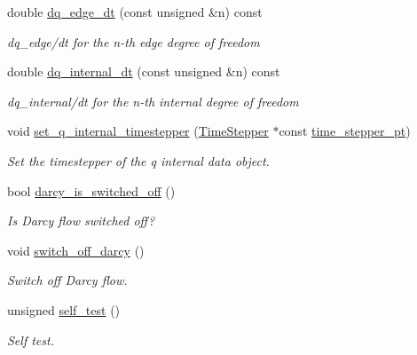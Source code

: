 \begin{DoxyCompactItemize}
double \hyperlink{classoomph_1_1AxisymmetricPoroelasticityEquations_aed0d46b9eea284a67bc3cc09571699a5}{dq\+\_\+edge\+\_\+dt} (const unsigned \&n) const
\begin{DoxyCompactList}\small\item\em dq\+\_\+edge/dt for the n-\/th edge degree of freedom \end{DoxyCompactList}\item 
double \hyperlink{classoomph_1_1AxisymmetricPoroelasticityEquations_a18c5fd291de25073cbef16ee6d0a4711}{dq\+\_\+internal\+\_\+dt} (const unsigned \&n) const
\begin{DoxyCompactList}\small\item\em dq\+\_\+internal/dt for the n-\/th internal degree of freedom \end{DoxyCompactList}\item 
void \hyperlink{classoomph_1_1AxisymmetricPoroelasticityEquations_aaa80b2ec1bfc01f49577560835d9d86d}{set\+\_\+q\+\_\+internal\+\_\+timestepper} (\hyperlink{classoomph_1_1TimeStepper}{Time\+Stepper} $\ast$const \hyperlink{classoomph_1_1GeomObject_a3c92023891dd4a0e818022f467eeb7f1}{time\+\_\+stepper\+\_\+pt})
\begin{DoxyCompactList}\small\item\em Set the timestepper of the q internal data object. \end{DoxyCompactList}\item 
bool \hyperlink{classoomph_1_1AxisymmetricPoroelasticityEquations_aaaff3ab360c7a99c6595624b035700a3}{darcy\+\_\+is\+\_\+switched\+\_\+off} ()
\begin{DoxyCompactList}\small\item\em Is Darcy flow switched off? \end{DoxyCompactList}\item 
void \hyperlink{classoomph_1_1AxisymmetricPoroelasticityEquations_aa33eeadfb4fe421494bcc21a82fdc2e2}{switch\+\_\+off\+\_\+darcy} ()
\begin{DoxyCompactList}\small\item\em Switch off Darcy flow. \end{DoxyCompactList}\item 
unsigned \hyperlink{classoomph_1_1AxisymmetricPoroelasticityEquations_a29c6268b887580ed0fbb65900467869b}{self\+\_\+test} ()
\begin{DoxyCompactList}\small\item\em Self test. \end{DoxyCompactList}\item 

\end{DoxyCompactItemize}
